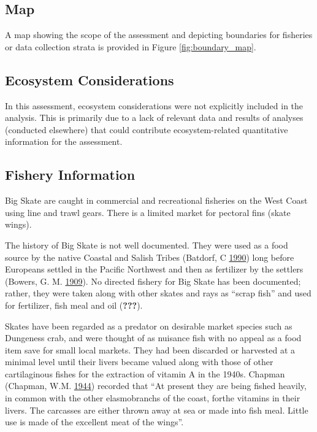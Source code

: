 \documentclass[12pt,]{article}
\begin{document}
\begin{landscape}


\end{landscape}

\hypertarget{map}{%
\subsection{Map}\label{map}}

A map showing the scope of the assessment and depicting boundaries for
fisheries or data collection strata is provided in Figure
\ref{fig:boundary_map}.

\hypertarget{ecosystem-considerations-1}{%
\subsection{Ecosystem Considerations}\label{ecosystem-considerations-1}}

In this assessment, ecosystem considerations were not explicitly
included in the analysis. This is primarily due to a lack of relevant
data and results of analyses (conducted elsewhere) that could contribute
ecosystem-related quantitative information for the assessment.

\hypertarget{fishery-information}{%
\subsection{Fishery Information}\label{fishery-information}}

Big Skate are caught in commercial and recreational fisheries on the
West Coast using line and trawl gears. There is a limited market for
pectoral fins (skate wings).

The history of Big Skate is not well documented. They were used as a
food source by the native Coastal and Salish Tribes (Batdorf, C
\protect\hyperlink{ref-Batdorf1990}{1990}) long before Europeans settled
in the Pacific Northwest and then as fertilizer by the settlers (Bowers,
G. M. \protect\hyperlink{ref-Bowers1909}{1909}). No directed fishery for
Big Skate has been documented; rather, they were taken along with other
skates and rays as ``scrap fish'' and used for fertilizer, fish meal and
oil ({\textbf{???}}).

Skates have been regarded as a predator on desirable market species such
as Dungeness crab, and were thought of as nuisance fish with no appeal
as a food item save for small local markets. They had been discarded or
harvested at a minimal level until their livers became valued along with
those of other cartilaginous fishes for the extraction of vitamin A in
the 1940s. Chapman (Chapman, W.M.
\protect\hyperlink{ref-Chapman1944}{1944}) recorded that ``At present
they are being fished heavily, in common with the other elasmobranchs of
the coast, forthe vitamins in their livers. The carcasses are either
thrown away at sea or made into fish meal. Little use is made of the
excellent meat of the wings''.
\end{document}
